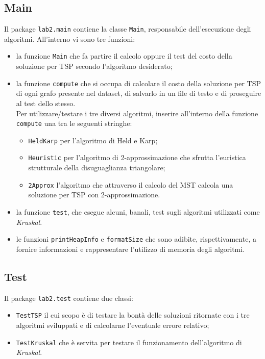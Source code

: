 \subsection{Main}
Il package \texttt{lab2.main} contiene la classe \texttt{Main}, responsabile dell'esecuzione degli algoritmi. All'interno vi sono tre funzioni:
\begin{itemize}
	\item la funzione \texttt{Main} che fa partire il calcolo oppure il test del costo della soluzione per TSP secondo l'algoritmo desiderato;
	\item la funzione \texttt{compute} che si occupa di calcolare il costo della soluzione per TSP di ogni grafo presente nel dataset, di salvarlo in un file di testo e di proseguire al test dello stesso.\\
	Per utilizzare/testare i tre diversi algoritmi, inserire all'interno della funzione \texttt{compute} una tra le seguenti stringhe:
	\begin{itemize}
		\item \texttt{HeldKarp} per l'algoritmo di Held e Karp;
		\item \texttt{Heuristic} per l'algoritmo di 2-approssimazione che sfrutta l'euristica strutturale della disuguaglianza triangolare;
		\item \texttt{2Approx} l'algoritmo che attraverso il calcolo del MST calcola una soluzione per TSP con 2-approssimazione.
	\end{itemize}
    \item la funzione \texttt{test}, che esegue alcuni, banali, test sugli algoritmi utilizzati come \textit{Kruskal}.
    \item le funzioni \texttt{printHeapInfo} e \texttt{formatSize} che sono adibite, rispettivamente, a fornire informazioni e rappresentare l'utilizzo di memoria degli algoritmi.
\end{itemize}

\subsection{Test}
Il package \texttt{lab2.test} contiene due classi:
\begin{itemize}
	\item \texttt{TestTSP} il cui scopo è di testare la bontà delle soluzioni ritornate con i tre algoritmi sviluppati e di calcolarne l'eventuale errore relativo;
	\item \texttt{TestKruskal} che è servita per testare il funzionamento dell'algoritmo di \textit{Kruskal}.
\end{itemize}